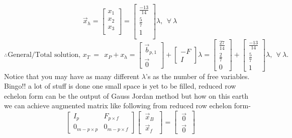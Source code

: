 \documentclass{article}
\begin{document}
\[
\vec{x}_h = \begin{bmatrix}
                x_1\\x_2\\x_3\\
            \end{bmatrix} = \begin{bmatrix}
                                \frac{-13}{14}\\
                                \frac{5}{7}\\
                                1\\
                                \end{bmatrix}\lambda, ~~\forall~\lambda~
\]
\[
\therefore\text{General/Total solution, }x_T~=~~ x_P + x_h = \begin{bmatrix}
    \vec{b}_{p,1}\\
     \hline
     \vec{0}
\end{bmatrix}+\begin{bmatrix}
    -F\\ 
    \hline
    I
\end{bmatrix}\lambda =
\begin{bmatrix}
    \frac{27}{14}\\
    \frac{2}{7}\\
    0
\end{bmatrix} + \begin{bmatrix}
                  \frac{-13}{14}\\
                  \frac{5}{7}\\
                  1
                \end{bmatrix}\lambda, ~~\forall~\lambda.
\]
Notice that you may have as many different $\lambda$'s as the number of free variables. \\
Bingo!! a lot of stuff is done one small space is yet to be filled, reduced row echelon form can be the output of Gauss Jordan method but how on this earth we can achieve augmented matrix like following from reduced row echelon form-
\[
\left[\begin{array}{c|c}
    I_p &F_{p\times f} \\
    \hline 
    0_{m-p\times p} & 0_{m-p\times f} 
  \end{array}\right] \begin{bmatrix}
                            ~\vec{x}_B~\\
                            \hline
                            ~\vec{x}_f~
                          \end{bmatrix}= \begin{bmatrix}
                            ~\vec{0}~\\
                            \hline
                            ~\vec{0}~
                          \end{bmatrix}
\]
\end{document}
